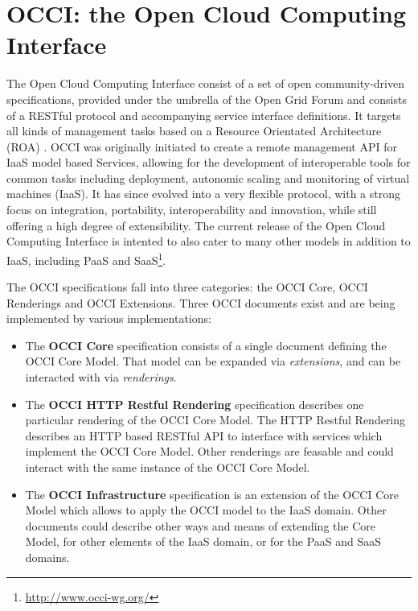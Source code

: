 \documentclass[10pt,conference,final,letterpaper,twoside,twocolumn,]{IEEEtran}
\newcommand{\I}[1]{\textit{#1}}
\newcommand{\B}[1]{\textbf{#1}}
\begin{document}
\section{OCCI: the Open Cloud Computing Interface}
\label{sec:occi}

 The Open Cloud Computing Interface consist of a set of open
 community-driven specifications, provided under the umbrella of the
 Open Grid Forum and consists of a RESTful \cite{REST_Fielding}
 protocol and accompanying service interface definitions.  It targets
 all kinds of management tasks based on a Resource Orientated
 Architecture (ROA) \cite{RR2007}.  OCCI was originally initiated to
 create a remote management API for IaaS model based Services,
 allowing for the development of interoperable tools for common tasks
 including deployment, autonomic scaling and monitoring of virtual
 machines (IaaS).  It has since evolved into a very flexible protocol,
 with a strong focus on integration, portability, interoperability and
 innovation, while still offering a high degree of extensibility.  The
 current release of the Open Cloud Computing Interface is intented to
 also cater to many other models in addition to IaaS, including PaaS
 and SaaS\footnote{\url{http://www.occi-wg.org/}}.

 The OCCI specifications fall into three categories: the OCCI Core,
 OCCI Renderings and OCCI Extensions.  Three OCCI documents exist and
 are being implemented by various implementations:
 
 \begin{itemize}
 
  \item The \B{OCCI Core} specification consists of a single document
  defining the OCCI Core Model. That model can be expanded via
  \I{extensions}, and can be interacted with via \I{renderings}.

  \item The \B{OCCI HTTP Restful Rendering} specification describes
  one particular rendering of the OCCI Core Model.  The HTTP Restful
  Rendering describes an HTTP based RESTful API to interface with
  services which implement the OCCI Core Model.  Other renderings are
  feasable and could interact with the same instance of the OCCI Core
  Model.  
 
  \item The \B{OCCI Infrastructure} specification is an extension of
  the OCCI Core Model which allows to apply the OCCI model to the IaaS
  domain. Other documents could describe other ways and means of
  extending the Core Model, for other elements of the IaaS domain, or
  for the PaaS and SaaS domains.  
  
 \end{itemize}
\end{document}
